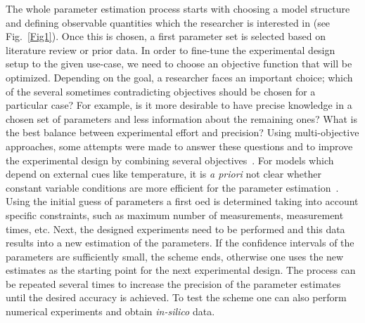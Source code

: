 \documentclass[graybox]{svmult}
\begin{document}
The whole parameter estimation process starts with choosing a model structure and defining observable quantities which the researcher is interested in (see Fig.~\ref{Fig1}).
Once this is chosen, a first parameter set is selected based on literature review or prior data.
In order to fine-tune the experimental design setup to the given use-case, we need to choose an objective function that will be optimized.
Depending on the goal, a researcher faces an important choice; which of the several sometimes contradicting objectives should be chosen for a particular case?
For example, is it more desirable to have precise knowledge in a chosen set of parameters and less information about the remaining ones?
What is the best balance between experimental effort and precision?
Using multi-objective approaches, some attempts were made to answer these questions and to improve the experimental design by combining several objectives~\cite{telenOptimalExperimentDesign2012, logistRobustMultiobjectiveOptimal2011}.
For models which depend on external cues like temperature, it is {\it a priori} not clear whether constant variable conditions are more efficient for the parameter estimation~\cite{versyckIntroducingOptimal1999,garciaQualityShelflifePrediction2015}.
Using the initial guess of parameters a first \ac{oed} is determined taking into account specific constraints, such as maximum number of measurements, measurement times, etc.
Next, the designed experiments need to be performed and this data results into a new estimation of the parameters.
If the confidence intervals of the parameters are sufficiently small, the scheme ends, otherwise one uses the new estimates as the starting point for the next experimental design.
The process can be repeated several times to increase the precision of the parameter estimates until the desired accuracy is achieved.
To test the scheme one can also perform numerical experiments and obtain {\it in-silico} data.
%
%
%
\end{document}
